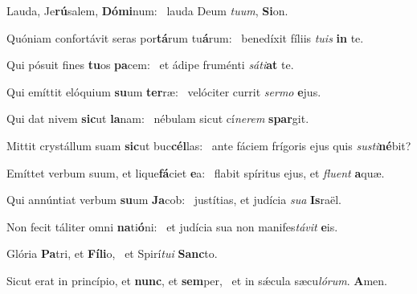 \item Lauda, Je\textbf{rú}salem, \textbf{Dó}\textbf{mi}num:~\psstar{} lauda Deum \textit{tu}\textit{um}, \textbf{Si}on.

\item Quóniam confortávit seras por\textbf{tá}rum tu\textbf{á}rum:~\psstar{} benedíxit fíliis \textit{tu}\textit{is} \textbf{in} te.

\item Qui pósuit fines \textbf{tu}os \textbf{pa}cem:~\psstar{} et ádipe fruménti \textit{sá}\textit{ti}\textbf{at} te.

\item Qui emíttit elóquium \textbf{su}um \textbf{ter}ræ:~\psstar{} velóciter currit \textit{ser}\textit{mo} \textbf{e}jus.

\item Qui dat nivem \textbf{sic}ut \textbf{la}nam:~\psstar{} nébulam sicut cí\textit{ne}\textit{rem} \textbf{spar}git.

\item Mittit crystállum suam \textbf{sic}ut buc\textbf{cél}las:~\psstar{} ante fáciem frígoris ejus quis \textit{sus}\textit{ti}\textbf{né}bit?

\item Emíttet verbum suum, et lique\textbf{fá}ciet \textbf{e}a:~\psstar{} flabit spíritus ejus, et \textit{flu}\textit{ent} \textbf{a}quæ.

\item Qui annúntiat verbum \textbf{su}um \textbf{Ja}cob:~\psstar{} justítias, et judícia \textit{su}\textit{a} \textbf{Is}raël.

\item Non fecit táliter omni \textbf{na}ti\textbf{ó}ni:~\psstar{} et judícia sua non manifes\textit{tá}\textit{vit} \textbf{e}is.

\item Glória \textbf{Pa}tri, et \textbf{Fí}\textbf{li}o,~\psstar{} et Spirí\textit{tu}\textit{i} \textbf{Sanc}to.

\item Sicut erat in princípio, et \textbf{nunc}, et \textbf{sem}per,~\psstar{} et in sǽcula sæcu\textit{ló}\textit{rum}. \textbf{A}men.